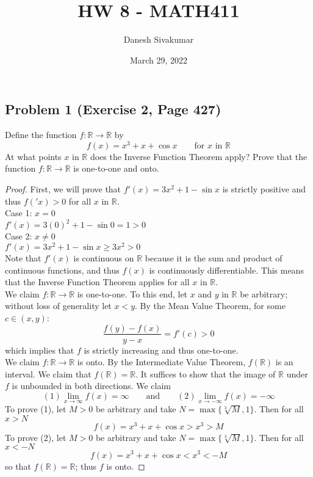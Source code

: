 \documentclass{article}
\title{HW 8 - MATH411}
\author{Danesh Sivakumar}
\date{March 29, 2022}
\begin{document}
\maketitle 


\subsection*{Problem 1 (Exercise 2, Page 427)}
Define the function $f \colon \mathbb{R} \to \mathbb{R}$ by
\[ f(x) = x^3 + x + \cos{x} \qquad \text{for $x$ in $\mathbb{R}$}\]
At what points $x$ in $\mathbb{R}$ does the Inverse Function Theorem apply? Prove that the function $f \colon \mathbb{R} \to \mathbb{R}$ is one-to-one and onto.
\begin{proof}
First, we will prove that $f'(x) = 3x^2 + 1 - \sin{x}$ is strictly positive and thus $f('x) > 0$ for all $x$ in $\mathbb{R}$. \\
Case 1: $x = 0$ \\
$f'(x) = 3(0)^2 + 1 - \sin{0} = 1 > 0$ \\
Case 2: $x \neq 0$ \\
$f'(x) = 3x^2 + 1 - \sin{x} \geq 3x^2 > 0$ \\
Note that $f'(x)$ is continuous on $\mathbb{R}$ because it is the sum and product of continuous functions, and thus $f(x)$ is continuously differentiable. This means that the Inverse Function Theorem applies for all $x$ in $\mathbb{R}$. \\
We claim $f \colon \mathbb{R} \to \mathbb{R}$ is one-to-one. To this end, let $x$ and $y$ in $\mathbb{R}$ be arbitrary; without loss of generality let $x < y$. By the Mean Value Theorem, for some $c \in (x, y)$:
\[\frac{f(y) - f(x)}{y - x} = f'(c) > 0 \]
which implies that $f$ is strictly increasing and thus one-to-one. \\
We claim $f \colon \mathbb{R} \to \mathbb{R}$ is onto. By the Intermediate Value Theorem, $f(\mathbb{R})$ is an interval. We claim that $f(\mathbb{R}) = \mathbb{R}$. It suffices to show that the image of $\mathbb{R}$ under $f$ is unbounded in both directions. We claim
\[ (1) \lim_{x \to \infty} f(x) = \infty \qquad \text{and} \qquad (2) \lim_{x \to -\infty} f(x) = -\infty\]
To prove (1), let $M > 0$ be arbitrary and take $N = \max{\{\sqrt[3]{M}, 1\}}$. Then for all $x > N$
\[ f(x) = x^3 + x + \cos{x} > x^3 > M\] 
To prove (2), let $M > 0$ be arbitrary and take $N = \max{\{\sqrt[3]{M}, 1\}}$. Then for all $x < -N$
\[ f(x) = x^3 + x + \cos{x} < x^3 < -M\]
so that $f(\mathbb{R}) = \mathbb{R}$; thus $f$ is onto.
\end{proof}
\end{document}
